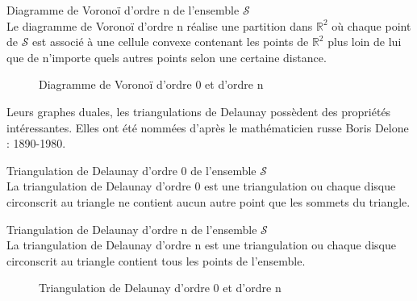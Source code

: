  \begin{Definition}{Diagramme de Voronoï d'ordre n de l'ensemble $\mathcal{S}$}\\
\label{def:tri-vor-n}
   Le diagramme de Voronoï d'ordre n réalise une partition dans $\mathbb{R}^2$ où chaque point de $\mathcal{S}$ est associé à une cellule convexe contenant les points de $\mathbb{R}^2$ plus loin de lui que de n'importe quels autres points selon une certaine distance.
\end{Definition}

\begin{figure}[h!]
  \centering
  \caption{Diagramme de Voronoï d'ordre 0 et d'ordre n}
\end{figure}

Leurs graphes duales, les triangulations de Delaunay possèdent des propriétés intéressantes.  Elles ont été nommées d'après le mathématicien russe Boris Delone : 1890-1980.

\begin{Definition}{Triangulation de Delaunay d'ordre 0 de l'ensemble $\mathcal{S}$}\\
\label{def:tri-del-0}
  La triangulation de Delaunay d'ordre 0 est une triangulation ou chaque disque circonscrit au triangle ne contient aucun autre point que les sommets du triangle.
\end{Definition}

\begin{Definition}{Triangulation de Delaunay d'ordre n de l'ensemble $\mathcal{S}$}\\
\label{def:tri-del-n}
  La triangulation de Delaunay d'ordre n est une triangulation ou chaque disque circonscrit au triangle contient tous les points de l'ensemble.
\end{Definition}

\begin{figure}[h!]
  \centering
  \caption{Triangulation de Delaunay d'ordre 0 et d'ordre n}
\end{figure}
